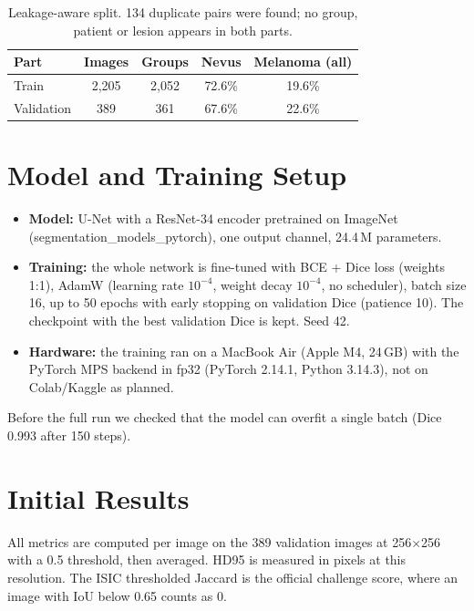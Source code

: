 \documentclass[11pt,a4paper]{article}
\begin{document}
\begin{table}[htbp]
\centering
\begin{tabular}{lcccc}
\toprule
\textbf{Part} & \textbf{Images} & \textbf{Groups} & \textbf{Nevus} & \textbf{Melanoma (all)} \\
\midrule
Train      & 2,205 & 2,052 & 72.6\% & 19.6\% \\
Validation & 389   & 361   & 67.6\% & 22.6\% \\
\bottomrule
\end{tabular}
\caption{Leakage-aware split. 134 duplicate pairs were found; no group, patient or lesion appears
in both parts.}
\end{table}

\section{Model and Training Setup}

\begin{itemize}[noitemsep]
  \item \textbf{Model:} U-Net with a ResNet-34 encoder pretrained on ImageNet
        (segmentation\_\allowbreak models\_\allowbreak pytorch), one output channel, 24.4\,M parameters.
  \item \textbf{Training:} the whole network is fine-tuned with BCE + Dice loss (weights 1:1),
        AdamW (learning rate $10^{-4}$, weight decay $10^{-4}$, no scheduler), batch size 16, up
        to 50 epochs with early stopping on validation Dice (patience 10). The checkpoint with the
        best validation Dice is kept. Seed 42.
  \item \textbf{Hardware:} the training ran on a MacBook Air (Apple M4, 24\,GB) with the PyTorch
        MPS backend in fp32 (PyTorch 2.14.1, Python 3.14.3), not on Colab/Kaggle as planned.
\end{itemize}
Before the full run we checked that the model can overfit a single batch (Dice 0.993 after 150
steps).

\section{Initial Results}

All metrics are computed per image on the 389 validation images at 256$\times$256 with a 0.5
threshold, then averaged. HD95 is measured in pixels at this resolution. The ISIC thresholded
Jaccard is the official challenge score, where an image with IoU below 0.65 counts as 0.
\end{document}
